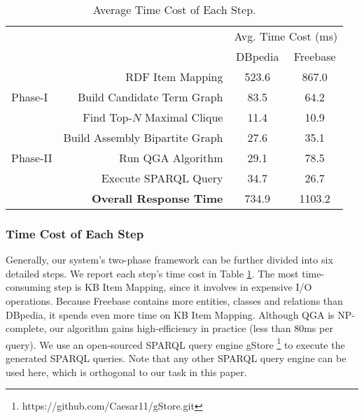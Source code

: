 \begin{table} [h]
\scalebox{0.92}
{

\begin{tabular}
{ l | r | c  c}
\hline
\multirow{2}{*}{} & \multirow{2}{*}{} & \multicolumn{2}{c}{Avg. Time Cost (ms)} \\
\cline{3-4}
& & DBpedia & Freebase \\
\hline
\multirow{3}{*}{Phase-I} 
& RDF Item Mapping               & 523.6 & 867.0 \\
& Build Candidate Term Graph     & 83.5  & 64.2 \\
& Find Top-$N$ Maximal Clique    & 11.4  & 10.9 \\
\hline
\multirow{3}{*}{Phase-II} 
& Build Assembly Bipartite Graph & 27.6  & 35.1 \\
& Run QGA Algorithm       & 29.1  & 78.5 \\
& Execute SPARQL Query           & 34.7  & 26.7\\
\hline
& \textbf{Overall Response Time} & 734.9 & 1103.2\\

\hline
\end{tabular}
}
\caption{Average Time Cost of Each Step. }
\label{tab:time_cost_each_step}
\vspace{-0.4in}
\end{table}


\subsubsection{Time Cost of Each Step}
Generally, our system's two-phase framework can be further divided into six detailed steps.
We report each step's time cost in Table \ref{tab:time_cost_each_step}. The most time-consuming step is KB Item Mapping, since it involves in expensive I/O operations.
Because Freebase contains more entities, classes and relations than DBpedia, it spends even more time on KB Item Mapping.
Although QGA is NP-complete, our algorithm gains high-efficiency in practice (less than 80ms per query).
We use an open-sourced SPARQL query engine gStore \footnote{https://github.com/Caesar11/gStore.git} \cite{zou2014gstore} to execute the generated SPARQL queries.
Note that any other SPARQL query engine can be used here, which is orthogonal to our task in this paper. 


